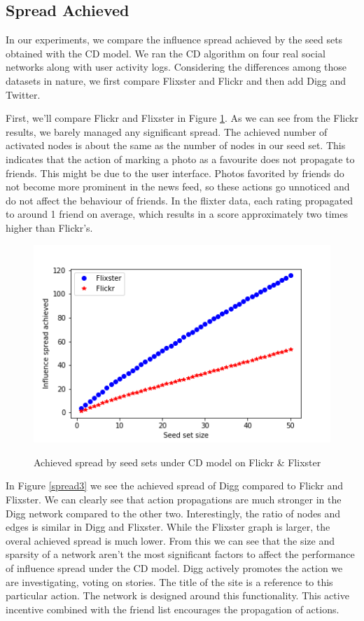 \documentclass{acm_proc_article-sp}
\begin{document}
\subsection*{Spread Achieved}
In our experiments, we compare the influence spread achieved by the seed sets obtained with the CD model. We ran the CD algorithm on four real social networks along with user activity logs. Considering the differences among those datasets in nature, we first compare Flixster and Flickr and then add Digg and Twitter.

First, we'll compare Flickr and Flixster in Figure \ref{spread2}. As we can see from the Flickr results, we barely managed any significant spread. The achieved number of activated nodes is about the same as the number of nodes in our seed set. This indicates that the action of marking a photo as a favourite does not propagate to friends. This might be due to the user interface. Photos favorited by friends do not become more prominent in the news feed, so these actions go unnoticed and do not affect the behaviour of friends. In the flixter data, each rating propagated to around 1 friend on average, which results in a score approximately two times higher than Flickr's.

\begin{figure}[h]
	\includegraphics[width=\linewidth]{spread2.png}
	\centering
	\label{spread2}
	\caption{Achieved spread by seed sets under CD model on Flickr \& Flixster}
\end{figure}

In Figure \ref{spread3} we see the achieved spread of Digg compared to Flickr and Flixster. We can clearly see that action propagations are much stronger in the Digg network compared to the other two. Interestingly, the ratio of nodes and edges is similar in Digg and Flixster. While the Flixster graph is larger, the overal achieved spread is much lower. From this we can see that the size and sparsity of a network aren't the most significant factors to affect the performance of influence spread under the CD model. Digg actively promotes the action we are investigating, voting on stories. The title of the site is a reference to this particular action. The network is designed around this functionality. This active incentive combined with the friend list encourages the propagation of actions.
\end{document}
